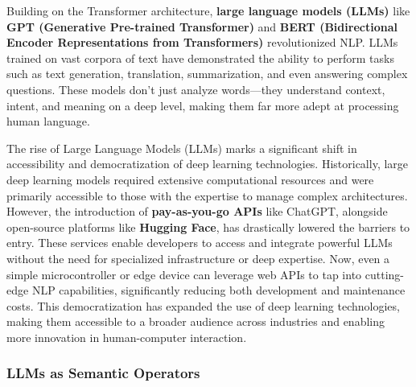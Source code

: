 Building on the Transformer architecture, \textbf{large language models (LLMs)} like \textbf{GPT (Generative Pre-trained Transformer)}\cite{radford2018improving} and \textbf{BERT (Bidirectional Encoder Representations from Transformers)}\cite{devlin2018bert} revolutionized NLP.
LLMs trained on vast corpora of text have demonstrated the ability to perform tasks such as text generation, translation, summarization, and even answering complex questions.
These models don’t just analyze words—they understand context, intent, and meaning on a deep level, making them far more adept at processing human language.

The rise of Large Language Models (LLMs) marks a significant shift in accessibility and democratization of deep learning technologies.
Historically, large deep learning models required extensive computational resources and were primarily accessible to those with the expertise to manage complex architectures.
However, the introduction of \textbf{pay-as-you-go APIs} like ChatGPT, alongside open-source platforms like \textbf{Hugging Face}, has drastically lowered the barriers to entry.
These services enable developers to access and integrate powerful LLMs without the need for specialized infrastructure or deep expertise.
Now, even a simple microcontroller or edge device can leverage web APIs to tap into cutting-edge NLP capabilities, significantly reducing both development and maintenance costs.
This democratization has expanded the use of deep learning technologies, making them accessible to a broader audience across industries and enabling more innovation in human-computer interaction.

\subsubsection{ LLMs as Semantic Operators}



